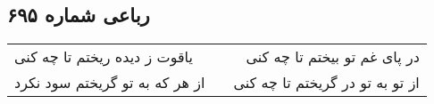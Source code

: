 \begin{center}
\section*{رباعی شماره ۶۹۵}
\label{sec:sh695}
\begin{longtable}{l p{0.5cm} r}
یاقوت ز دیده ریختم تا چه کنی
&&
در پای غم تو بیختم تا چه کنی
\\
از هر که به تو گریختم سود نکرد
&&
از تو به تو در گریختم تا چه کنی
\\
\end{longtable}
\end{center}
